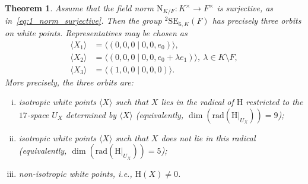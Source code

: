 \documentclass{amsart}
\def\NN{\mathord{\mathrm{N}}}
\newcommand{\SE}{\mathrm{SE}}
\newcommand{\rad}{\mathrm{rad}}
\renewcommand{\H}{\mathrm{H}}
\theoremstyle{plain}
\newtheorem{theorem}{Theorem}
\numberwithin{theorem}{section}
\theoremstyle{definition}
\begin{document}
\begin{theorem}
\label{theorem:6_three_orbits}
Assume that the field norm $\NN_{K/F}:K^{\times}\rightarrow F^{\times}$ is
surjective, as in~\eqref{eq:1_norm_surjective}. Then the group
${}^2\SE_{6,K}(F)$ has precisely three orbits on white points. Representatives may be chosen as
\[
\begin{aligned}
	\langle X_1 \rangle &= \langle (0,0,0\mid 0,0,e_0)\rangle,\\
	\langle X_2 \rangle &= \langle (0,0,0\mid 0,0,e_0+\lambda e_1)\rangle,\  \lambda \in K\setminus F,\\
	\langle X_3 \rangle &= \langle (1,0,0\mid 0,0,0)\rangle.
 \end{aligned}
\]
More precisely, the three orbits are:
\begin{enumerate}[(i)]
	\item isotropic white points $\langle X \rangle$ such that $X$ lies in the radical of $\H$
		restricted to the $17$-space $U_X$ determined by $\langle X \rangle$
		(equivalently, $\dim(\rad(\H|_{U_X})) = 9$);
	\item isotropic white points $\langle X \rangle$ such that $X$ does not lie in this radical
		(equivalently, $\dim(\rad(\H|_{U_X})) = 5$);
	\item non-isotropic white points, i.e., $\H(X)\neq 0$.
\end{enumerate}

\end{theorem}
\end{document}
